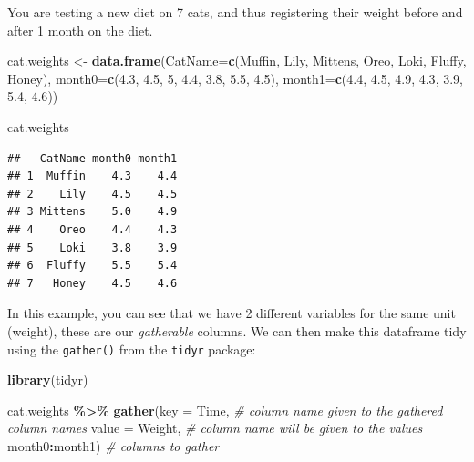 \documentclass[
]{book}
\newenvironment{Shaded}{\begin{snugshade}}{\end{snugshade}}
\newcommand{\AttributeTok}[1]{\textcolor[rgb]{0.13,0.29,0.53}{#1}}
\newcommand{\CommentTok}[1]{\textcolor[rgb]{0.56,0.35,0.01}{\textit{#1}}}
\newcommand{\DecValTok}[1]{\textcolor[rgb]{0.00,0.00,0.81}{#1}}
\newcommand{\FloatTok}[1]{\textcolor[rgb]{0.00,0.00,0.81}{#1}}
\newcommand{\FunctionTok}[1]{\textcolor[rgb]{0.13,0.29,0.53}{\textbf{#1}}}
\newcommand{\NormalTok}[1]{#1}
\newcommand{\OtherTok}[1]{\textcolor[rgb]{0.56,0.35,0.01}{#1}}
\newcommand{\SpecialCharTok}[1]{\textcolor[rgb]{0.81,0.36,0.00}{\textbf{#1}}}
\newcommand{\StringTok}[1]{\textcolor[rgb]{0.31,0.60,0.02}{#1}}
\begin{document}
You are testing a new diet on 7 cats, and thus registering their weight before and after 1 month on the diet.

\begin{Shaded}
\begin{Highlighting}[]
\NormalTok{cat.weights }\OtherTok{\textless{}{-}} \FunctionTok{data.frame}\NormalTok{(}\AttributeTok{CatName=}\FunctionTok{c}\NormalTok{(}\StringTok{\textquotesingle{}Muffin\textquotesingle{}}\NormalTok{, }\StringTok{\textquotesingle{}Lily\textquotesingle{}}\NormalTok{, }\StringTok{\textquotesingle{}Mittens\textquotesingle{}}\NormalTok{, }\StringTok{\textquotesingle{}Oreo\textquotesingle{}}\NormalTok{, }\StringTok{\textquotesingle{}Loki\textquotesingle{}}\NormalTok{, }\StringTok{\textquotesingle{}Fluffy\textquotesingle{}}\NormalTok{, }\StringTok{\textquotesingle{}Honey\textquotesingle{}}\NormalTok{),}
                          \AttributeTok{month0=}\FunctionTok{c}\NormalTok{(}\FloatTok{4.3}\NormalTok{, }\FloatTok{4.5}\NormalTok{, }\DecValTok{5}\NormalTok{, }\FloatTok{4.4}\NormalTok{, }\FloatTok{3.8}\NormalTok{, }\FloatTok{5.5}\NormalTok{, }\FloatTok{4.5}\NormalTok{),}
                          \AttributeTok{month1=}\FunctionTok{c}\NormalTok{(}\FloatTok{4.4}\NormalTok{, }\FloatTok{4.5}\NormalTok{, }\FloatTok{4.9}\NormalTok{, }\FloatTok{4.3}\NormalTok{, }\FloatTok{3.9}\NormalTok{, }\FloatTok{5.4}\NormalTok{, }\FloatTok{4.6}\NormalTok{))}

\NormalTok{cat.weights}
\end{Highlighting}
\end{Shaded}

\begin{verbatim}
##   CatName month0 month1
## 1  Muffin    4.3    4.4
## 2    Lily    4.5    4.5
## 3 Mittens    5.0    4.9
## 4    Oreo    4.4    4.3
## 5    Loki    3.8    3.9
## 6  Fluffy    5.5    5.4
## 7   Honey    4.5    4.6
\end{verbatim}

In this example, you can see that we have 2 different variables for the same unit (weight), these are our \emph{gatherable} columns.
We can then make this dataframe tidy using the \texttt{gather()} from the \texttt{tidyr} package:

\begin{Shaded}
\begin{Highlighting}[]
\FunctionTok{library}\NormalTok{(tidyr)}

\NormalTok{cat.weights }\SpecialCharTok{\%\textgreater{}\%} 
  \FunctionTok{gather}\NormalTok{(}\AttributeTok{key =}\NormalTok{ Time, }\CommentTok{\# column name given to the gathered column names}
         \AttributeTok{value =}\NormalTok{ Weight, }\CommentTok{\# column name will be given to the values}
\NormalTok{         month0}\SpecialCharTok{:}\NormalTok{month1) }\CommentTok{\# columns to gather}
\end{Highlighting}
\end{Shaded}
\end{document}
